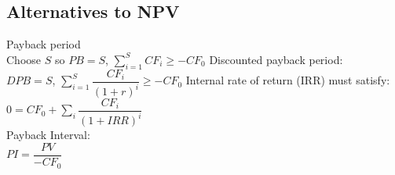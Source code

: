 \subsection*{Alternatives to NPV}
Payback period\\
Choose $S$ so $PB = S$, $\sum_{i=1}^S CF_i \geq - CF_0$ 
Discounted payback period: \\
$DPB = S$, $\sum_{i=1}^S \dfrac{CF_i}{(1+r)^i} \geq - CF_0$
Internal rate of return (IRR) must satisfy: \\
$0 = CF_0 +\sum_i\dfrac{CF_i}{(1+IRR)^i}$ \\
Payback Interval:\\
$PI = \dfrac{PV}{-CF_0}$
